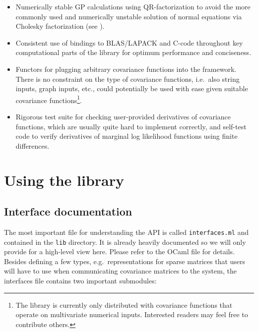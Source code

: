 \documentclass[10pt]{report}
\begin{document}
\begin{itemize}
\item Numerically stable GP calculations using QR-factorization to avoid the
more commonly used and numerically unstable solution of normal equations via
Cholesky factorization (see \cite{Foster2009}).

\item Consistent use of bindings to BLAS/LAPACK and C-code throughout key
computational parts of the library for optimum performance and conciseness.

\item Functors for plugging arbitrary covariance functions into the framework.
There is no constraint on the type of covariance functions, i.e.\ also string
inputs, graph inputs, etc., could potentially be used with ease given suitable
covariance functions\footnote{The library is currently only distributed with
covariance functions that operate on multivariate numerical inputs.  Interested
readers may feel free to contribute others.}.

\item Rigorous test suite for checking user-provided derivatives of covariance
functions, which are usually quite hard to implement correctly, and self-test
code to verify derivatives of marginal log likelihood functions using finite
differences.

\end{itemize}

\chapter{Using the library}

\section{Interface documentation}

The most important file for understanding the API is called \verb=interfaces.ml=
and contained in the \verb=lib= directory.  It is already heavily documented so
we will only provide for a high-level view here.  Please refer to the OCaml file
for details.  Besides defining a few types, e.g.\ representations for sparse
matrices that users will have to use when communicating covariance matrices to
the system, the interfaces file contains two important submodules:
\end{document}
